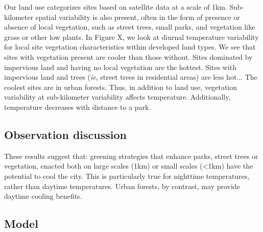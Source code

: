 \documentclass[draft,linenumbers]{agujournal}
\begin{document}
Our land use categorizes sites based on satellite data at a scale of 1km. Sub-kilometer spatial variability is also present, often in the form of presence or absence of local vegetation, such as street trees, small parks, and vegetation like grass or other low plants. In Figure X, we look at diurnal temperature variability for local site vegetation characteristics within developed land types. We see that sites with vegetation present are cooler than those without. Sites dominated by impervious land and having no local vegetation are the hottest. Sites with impervious land and trees (\textit{ie}, street trees in residential areas) are less hot... The coolest sites are in urban forests. Thus, in addition to land use, vegetation variability at sub-kilometer variability affects temperature. 
Additionally, temperature decreases with distance to a park. 
\subsection{Observation discussion}

These results suggest that: greening strategies that enhance parks, street trees or vegetation, enacted both on large scales (1km) or small scales (<1km) have the potential to cool the city. This is particularly true for nighttime temperatures, rather than daytime temperatures. Urban forests, by contrast, may provide daytime cooling benefits.
 
\subsection{Model}
\end{document}
